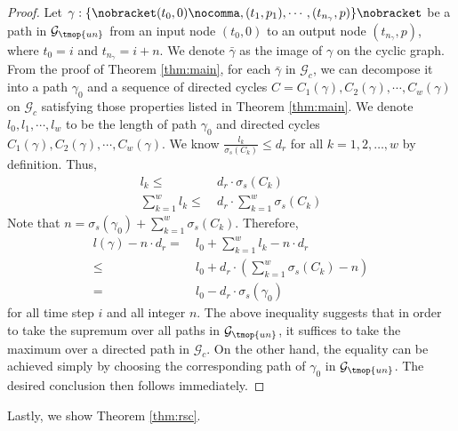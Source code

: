 \begin{proof}
Let $\gamma : \{ \nobracket (t_0, 0) \nocomma, (t_1,
  p_1), \cdots, (t_{n_\gamma}, p) \} \nobracket$ be a path in $\mathcal{G}_{\tmop{un}}$ from an input node $(t_0, 0)$ to an output node $(t_{n_{\gamma}}, p)$, where $t_0 = i$ and $t_{n_\gamma} = i+n$. We denote $\bar{\gamma}$
  as the image of $\gamma$ on the cyclic graph. 
From the proof of Theorem \ref{thm:main}, for each $\bar{\gamma}$ in $\mathcal{G}_{c}$, we can decompose it into a path $\gamma_0$ and a sequence of directed cycles $C = C_1 (\gamma), C_2 (\gamma), \cdots, C_w (\gamma)$ on
  $\mathcal{G}_c$ satisfying those properties listed in Theorem \ref{thm:main}.
We denote $l_0, l_1, \cdots, l_w$ to be the length of
  path $\gamma_0$ and directed cycles $C_1 (\gamma), C_2 (\gamma), \cdots, C_w
  (\gamma)$. We know $\frac{l_k}{\sigma_s(C_k)} \leq d_r$ for all $k = 1,2,\dots,w$ by definition. Thus,
\begin{align*}
    l_k \leq & \:d_r\cdot \sigma_s(C_k) \\
    \sum_{k=1}^w l_k \leq & \:d_r\cdot \sum_{k=1}^w  \sigma_s(C_k) 
\end{align*}
Note that $n = \sigma_s(\gamma_0) + \sum_{k=1}^w  \sigma_s(C_k) $. Therefore,
\begin{align*}
    l(\gamma) - n\cdot d_r = &\:l_0 +\sum_{k=1}^w l_k- n\cdot d_r \\\leq & \:l_0+d_r\cdot (\sum_{k=1}^w  \sigma_s(C_k)-n)
    \\= & \: l_0- d_r \cdot \sigma_s(\gamma_0)
\end{align*}
for all time step $i$ and all integer $n$. The above inequality suggests that in order to take the supremum over all paths in $\mathcal{G}_{\tmop{un}}$, it suffices to take the maximum over a directed path in $\mathcal{G}_c$. On the other hand, the equality can be achieved simply by choosing the corresponding path of $\gamma_0$ in $\mathcal{G}_{\tmop{un}}$. The desired conclusion then follows immediately.

\end{proof}

Lastly, we show Theorem \ref{thm:rsc}.

